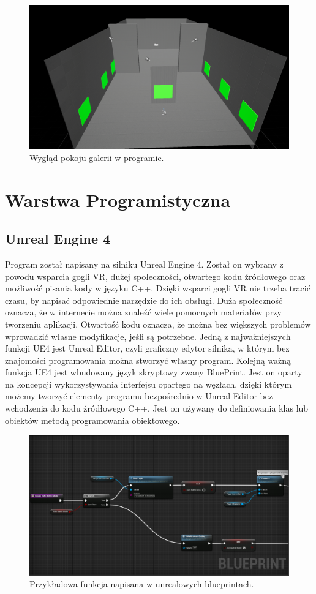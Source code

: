 \documentclass[a4paper,12pt,reqno]{article}
\begin{document}
\begin{figure}[!ht]%
\centering
\includegraphics[width=0.8\columnwidth]{graphics/Level.png}
\caption{Wygląd pokoju galerii w programie.
\label{OpenBrush}}%
%
\qquad
\end{figure}  

\newpage
\section{Warstwa Programistyczna}

\subsection{Unreal Engine 4}

Program został napisany na silniku Unreal Engine 4. Został on wybrany z powodu wsparcia gogli VR, dużej społeczności, otwartego kodu źródłowego oraz możliwość pisania kody w języku C++. Dzięki wsparci gogli VR nie trzeba tracić czasu, by napisać odpowiednie narzędzie do ich obsługi. Duża społeczność oznacza, że w internecie można znaleźć wiele pomocnych materiałów przy tworzeniu aplikacji. Otwartość kodu oznacza, że można bez większych problemów wprowadzić własne modyfikacje, jeśli są potrzebne. Jedną z najważniejszych funkcji UE4 jest Unreal Editor, czyli graficzny edytor silnika, w którym bez znajomości programowania można stworzyć własny program. Kolejną ważną funkcja UE4 jest wbudowany język skryptowy zwany BluePrint. Jest on oparty na koncepcji wykorzystywania interfejsu opartego na węzłach, dzięki którym możemy tworzyć elementy programu bezpośrednio w Unreal Editor bez wchodzenia do kodu źródłowego C++. Jest on używany do definiowania klas lub obiektów metodą programowania obiektowego.

\begin{figure}[!ht]%
\centering
\includegraphics[width=0.8\columnwidth]{graphics/BPExample.png}
\caption{Przykładowa funkcja napisana w unrealowych blueprintach.
\label{BPExample}}%
%
\qquad
\end{figure}  
\end{document}
